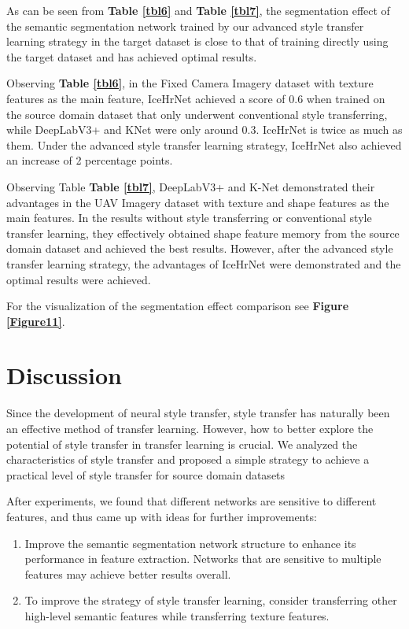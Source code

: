 \documentclass[a4paper,fleqn]{cas-dc}
\begin{document}
As can be seen from \textbf{Table \ref{tbl6}} and \textbf{Table \ref{tbl7}}, the segmentation effect of the semantic segmentation network trained by our advanced style transfer learning strategy in the target dataset is close to that of training directly using the target dataset and has achieved optimal results.

Observing \textbf{Table \ref{tbl6}}, in the Fixed Camera Imagery dataset with texture features as the main feature, IceHrNet achieved a score of 0.6 when trained on the source domain dataset that only underwent conventional style transferring, while DeepLabV3+ and KNet were only around 0.3. IceHrNet is twice as much as them. Under the advanced style transfer learning strategy, IceHrNet also achieved an increase of 2 percentage points.

Observing Table \textbf{Table \ref{tbl7}}, DeepLabV3+ and K-Net demonstrated their advantages in the UAV Imagery dataset with texture and shape features as the main features. In the results without style transferring or conventional style transfer learning, they effectively obtained shape feature memory from the source domain dataset and achieved the best results. However, after the advanced style transfer learning strategy, the advantages of IceHrNet were demonstrated and the optimal results were achieved.

For the visualization of the segmentation effect comparison see \textbf{Figure \ref{Figure11}}.

\section{Discussion}

Since the development of neural style transfer, style transfer has naturally been an effective method of transfer learning. However, how to better explore the potential of style transfer in transfer learning is crucial. We analyzed the characteristics of style transfer and proposed a simple strategy to achieve a practical level of style transfer for source domain datasets

After experiments, we found that different networks are sensitive to different features, and thus came up with ideas for further improvements:
\begin{enumerate}
	\item Improve the semantic segmentation network structure to enhance its performance in feature extraction. Networks that are sensitive to multiple features may achieve better results overall.
	\item To improve the strategy of style transfer learning, consider transferring other high-level semantic features while transferring texture features.
\end{enumerate}
\end{document}
